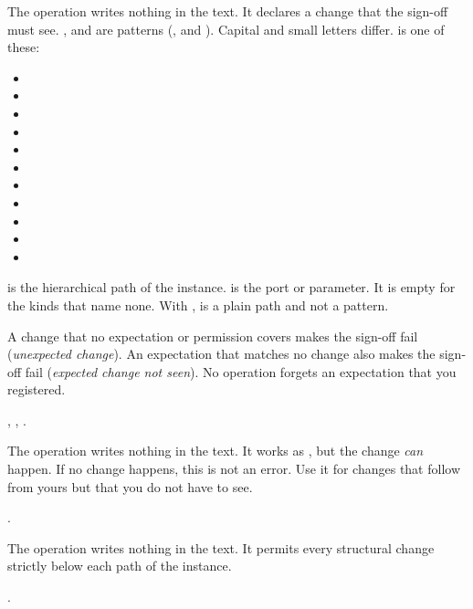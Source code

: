 \begin{entry}{}
\item[Writes] The operation writes nothing in the text. It declares a change that the
  sign-off must see. ,  and  are patterns (\code{*},
   and \code{[...]}). Capital and small letters differ.  is one of
  these:
  \begin{itemize}
  \item {}
  \item {}
  \item {}
  \item {}
  \item {}
  \item {}
  \item {}
  \item {}
  \item {}
  \item {}
  \item {}
  \end{itemize}
   is the hierarchical path of the instance.  is the port or
  parameter. It is empty for the kinds that name none. With ,
   is a plain path and not a pattern.
\item[Rules] A change that no expectation or permission covers makes the sign-off fail
  (\emph{unexpected change}). An expectation that matches no change also makes the
  sign-off fail (\emph{expected change not seen}). No operation forgets an expectation that you registered.
\item[Example] , , .
\end{entry}

\begin{entry}{}
\item[Writes] The operation writes nothing in the text. It works as
  , but the change \emph{can} happen. If no change happens, this is
  not an error. Use it for changes that follow from yours but that you do not have to see.
\item[Example] .
\end{entry}

\begin{entry}{}
\item[Writes] The operation writes nothing in the text. It permits every structural
  change strictly below each path of the instance.
\item[Example] .
\end{entry}

